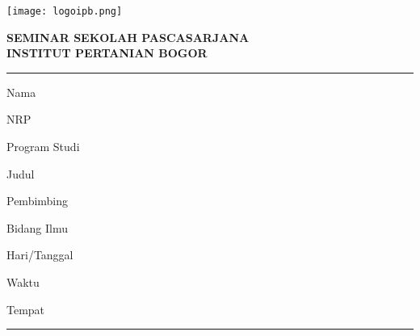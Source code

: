 \thispagestyle{empty}
\begin{titlepage}
   \centering %
   {\texttt{[image: logoipb.png]} \par}

   {\small \bf SEMINAR SEKOLAH PASCASARJANA \\
   INSTITUT PERTANIAN BOGOR \par }

   \rule{15cm}{1.0pt}
   \begin{flushleft}
      Nama \tab{: \Nama}

      NRP \tab{: \NRP}

      Program Studi \tab{: \ProgramStudi}

      Judul \tab{: \textbf{\Judul}}

      Pembimbing 


      Bidang Ilmu \tab{: \BidangIlmu}

      Hari/Tanggal \tab{: \Hari, \Tanggal}

      Waktu \tab{: \Waktu}

      Tempat \tab{:~\Tempat}

             \tab{~~\TempatDua}

   \end{flushleft}
   \rule{15cm}{1.5pt}
\end{titlepage}
